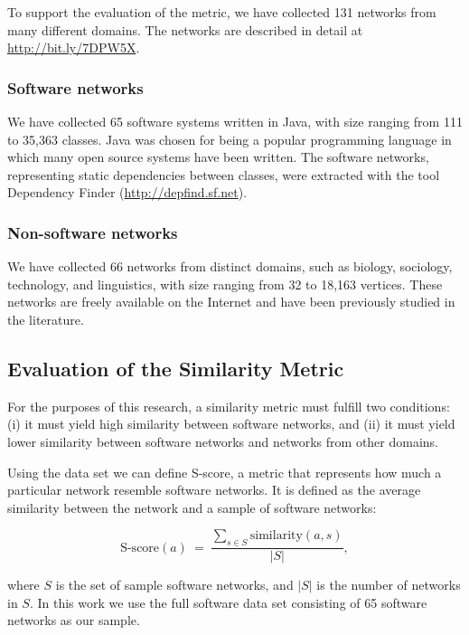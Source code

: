 To support the evaluation of the metric, we have collected 131 networks from
many different domains. The networks are described in detail at
\url{http://bit.ly/7DPW5X}.

\subsubsection{Software networks} We have collected 65 software systems written
in Java, with size ranging from 111 to 35,363 classes. Java was chosen for
being a popular programming language in which many open source systems have
been written. The software networks, representing static dependencies between
classes, were extracted with the tool Dependency Finder
(\url{http://depfind.sf.net}).

\subsubsection{Non-software networks} We have collected 66 networks from
distinct domains, such as biology, sociology, technology, and linguistics, with
size ranging from 32 to 18,163 vertices. These networks are freely available on
the Internet and have been previously studied in the literature.

\subsection{Evaluation of the Similarity Metric}


For the purposes of this research, a similarity metric must fulfill two
conditions: (i) it must yield high similarity between software networks, and
(ii) it must yield lower similarity between software networks and networks from
other domains.

Using the data set we can define S-score, a metric that represents how much a
particular network resemble software networks. It is defined as the average
similarity between the network and a sample of software networks:

$$
\mathrm{S\mbox{-}score}(a) ~=~ \frac{
\displaystyle\sum_{s \in S} \mathrm{similarity}(a, s)
}{|S|} \mathrm{,}
$$

where $S$ is the set of sample software networks, and $|S|$ is the number of
networks in $S$. In this work we use the full software data set consisting of
65 software networks as our sample.

